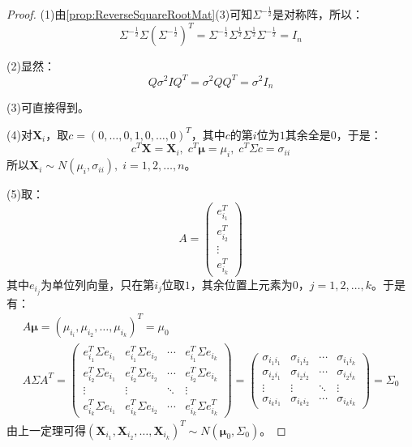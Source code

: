\begin{proof}
	(1)由\cref{prop:ReverseSquareRootMat}(3)可知$\Sigma^{-\frac{1}{2}}$是对称阵，所以：
	\begin{equation*}
		\Sigma^{-\frac{1}{2}}\Sigma(\Sigma^{-\frac{1}{2}})^T=\Sigma^{-\frac{1}{2}}\Sigma^{\frac{1}{2}}\Sigma^{\frac{1}{2}}\Sigma^{-\frac{1}{2}}=I_n
	\end{equation*}\par
	(2)显然：
	\begin{equation*}
		Q\sigma^2IQ^T=\sigma^2QQ^T=\sigma^2I_n
	\end{equation*}\par
	(3)可直接得到。\par
	(4)对$\mathbf{X}_i$，取$c=(0,\dots,0,1,0,\dots,0)^T$，其中$c$的第$i$位为$1$其余全是$0$，于是：
	\begin{equation*}
		c^T\mathbf{X}=\mathbf{X}_i,\;c^T\boldsymbol{\mu}=\mu_i,\;c^T\Sigma c=\sigma_{ii}
	\end{equation*}
	所以$\mathbf{X}_i\sim N(\mu_i,\sigma_{ii}),\;i=1,2,\dots,n$。\par
	(5)取：
	\begin{equation*}
		A=
		\begin{pmatrix}
			e_{i_1}^T \\
			e_{i_2}^T \\
			\vdots \\
			e_{i_k}^T
		\end{pmatrix}
	\end{equation*}
	其中$e_{i_j}$为单位列向量，只在第$i_j$位取$1$，其余位置上元素为$0$，$j=1,2,\dots,k$。于是有：
	\begin{gather*}
		A\boldsymbol{\mu}=(\mu_{i_i},\mu_{i_2},\dots,\mu_{i_k})^T=\mu_0
		\\
		A\Sigma A^T=
		\begin{pmatrix}
			e_{i_1}^T\Sigma e_{i_1} & e_{i_1}^T\Sigma e_{i_2} & \cdots & e_{i_1}^T\Sigma e_{i_k} \\
			e_{i_2}^T\Sigma e_{i_1} & e_{i_2}^T\Sigma e_{i_2} & \cdots & e_{i_2}^T\Sigma e_{i_k} \\
			\vdots & \vdots & \ddots & \vdots \\
			e_{i_k}^T\Sigma e_{i_1} & e_{i_k}^T\Sigma e_{i_2} & \cdots & e_{i_k}^T\Sigma e_{i_k}^T
		\end{pmatrix}
		=
		\begin{pmatrix}
			\sigma_{i_1i_1} & \sigma_{i_1i_2} & \cdots & \sigma_{i_1i_k} \\
			\sigma_{i_2i_1} & \sigma_{i_2i_2} & \cdots & \sigma_{i_2i_k} \\
			\vdots & \vdots & \ddots & \vdots \\
			\sigma_{i_ki_1} & \sigma_{i_ki_2} & \cdots & \sigma_{i_ki_k}
		\end{pmatrix}
		=\Sigma_0
	\end{gather*}
	由上一定理可得$(\mathbf{X}_{i_1},\mathbf{X}_{i_2},\dots,\mathbf{X}_{i_k})^T\sim N(\boldsymbol{\mu}_0,\Sigma_0)$。
\end{proof}
